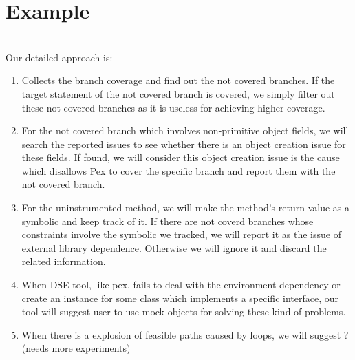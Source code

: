 \section{Example}






\\Our detailed approach is:
\begin{enumerate}
\item Collects the branch coverage and find out the not covered branches. If the target statement of the not covered branch is covered, we simply filter out these not covered branches as it is useless for achieving higher coverage.
\item For the not covered branch which involves non-primitive object fields, we will search the reported issues to see whether there is an object creation issue for these fields. If found, we will consider this object creation issue is the cause which disallows Pex to cover the specific branch and report them with the not covered branch. 
\item For the uninstrumented method, we will make the method's return value as a symbolic and keep track of it. If there are not coverd branches whose constraints involve the symbolic we tracked, we will report it as the issue of external library dependence. Otherwise we will ignore it and discard the related information.
\item When DSE tool, like pex, fails to deal with the environment dependency or create an instance for some class which implements a specific interface, our tool will suggest user to use mock objects for solving these kind of problems.
\item When there is a explosion of feasible paths caused by loops, we will suggest ? (needs more experiments)
\end{enumerate}